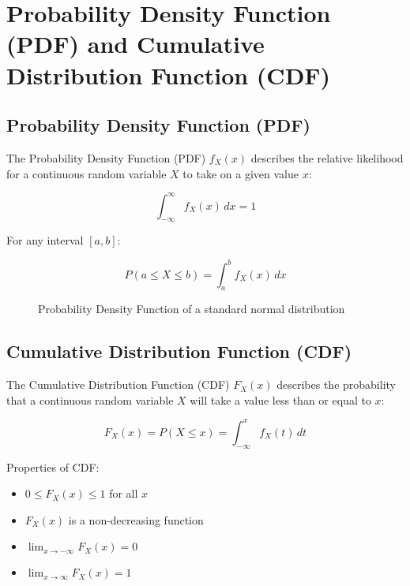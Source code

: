 \section{Probability Density Function (PDF) and Cumulative Distribution Function (CDF)}

\subsection{Probability Density Function (PDF)}

The Probability Density Function (PDF) \(f_X(x)\) describes the relative likelihood for a continuous random variable \(X\) to take on a given value \(x\):

\[
\int_{-\infty}^{\infty} f_X(x) \, dx = 1
\]

For any interval \([a, b]\):

\[
P(a \leq X \leq b) = \int_{a}^{b} f_X(x) \, dx
\]

\begin{figure}[H]
    \centering
    \caption{Probability Density Function of a standard normal distribution}
\end{figure}

\subsection{Cumulative Distribution Function (CDF)}

The Cumulative Distribution Function (CDF) \(F_X(x)\) describes the probability that a continuous random variable \(X\) will take a value less than or equal to \(x\):

\[
F_X(x) = P(X \leq x) = \int_{-\infty}^{x} f_X(t) \, dt
\]

Properties of CDF:
\begin{itemize}
    \item \(0 \leq F_X(x) \leq 1\) for all \(x\)
    \item \(F_X(x)\) is a non-decreasing function
    \item \(\lim_{x \to -\infty} F_X(x) = 0\)
    \item \(\lim_{x \to \infty} F_X(x) = 1\)
\end{itemize}

